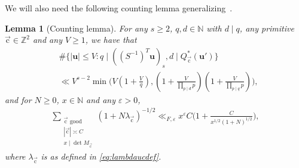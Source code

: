 \documentclass[letterpaper,11pt]{amsart}
\numberwithin{equation}{section}
\newtheorem{lemma}[theorem]{Lemma}
\theoremstyle{definition}
\numberwithin{equation}{section}
\newcommand{\ZZ}{\mathbb{Z}}
\newcommand{\NN}{\mathbb{N}}
\newcommand{\uu}{\mathbf{u}}
\newcommand{\uc}{{\vec{\mathrm{c}}}}
\begin{document}
We will also need the following counting lemma generalizing~\cite[Lemma 8.1]{V19}.
\begin{lemma}[Counting lemma]\label{counting}
	For any $s\geq 2$, $q,d\in \NN$ with $d\mid q$, any primitive $\uc\in \ZZ^2$ and any $V\geq 1$, we have that 
	\begin{align}\nonumber
	&\#\{|\uu|\leq V: q\mid ((S^{-1})^T \uu)_s, d\mid Q_{\uc}^*(\uu')\}\\
    \label{eq:Vsum1}
    &\ll V^{s-2}\min\Big(V(1+\frac{V}{q}), (1+\frac{V}{\prod_{p\mid d}p})(1+\frac{V}{\prod_{p\mid q}p})\Big),
	\end{align}
	and for $N\geq 0$, $x\in\NN$ and any $\varepsilon>0$, 
	\begin{align}\label{eq:B1}
	\sum_{\substack{\uc\textrm{ good }\\|\uc|\asymp C\\ x\mid \det M_{\uc}}}(1+N\lambda_\uc)^{-1/2}\ll_{F, \varepsilon} x^\varepsilon C \Big(1+ \frac{C}{x^{1/2}(1+N)^{1/2}}\Big),
	\end{align}
	where $\lambda_\uc$ is as defined in \eqref{eq:lambdaucdef}.
\end{lemma}
\end{document}
